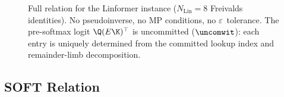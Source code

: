 \documentclass[runningheads]{llncs}
\begin{document}
{\begin{figure}[H]
\center
{}
\caption{Full relation for the Linformer instance ($N_{\text{Lin}}{=}8$ Freivalds identities). No pseudoinverse, no MP conditions, no $\varepsilon$~tolerance. The pre-softmax logit $\Q(E\K)^{\top}$ is uncommitted ($\uncomwit$): each entry is uniquely determined from the committed lookup index and remainder-limb decomposition.}
\label{fig:relation-linformer}
\end{figure}

\subsection{SOFT Relation}
\label{appx:rel-soft}

}
\end{document}
